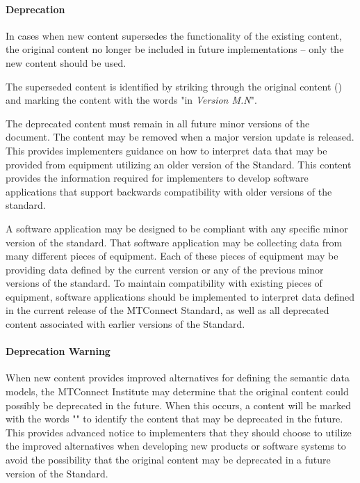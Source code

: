 \paragraph{Deprecation}\mbox{}

In cases when new content supersedes the functionality of the existing content, the original content \MUST no longer be included in future implementations -- only the new content should be used.

The superseded content is identified by striking through the original content () and marking the content with the words "\DEPRECATED in \textit{Version M.N}".

The deprecated content must remain in all future \gls{minor} versions of the document.  The content may be removed when a \gls{major} version update is released.  This provides implementers guidance on how to interpret data that may be provided from equipment utilizing an older version of the Standard.  This content provides the information required for implementers to develop software applications that support backwards compatibility with older versions of the standard.

A software application may be designed to be compliant with any specific \gls{minor} version of the standard.  That software application may be collecting data from many different pieces of equipment.  Each of these pieces of equipment may be providing data defined by the current version or any of the previous \gls{minor} versions of the standard.  To maintain compatibility with existing pieces of equipment, software applications should be implemented to interpret data defined in the current release of the MTConnect Standard, as well as all deprecated content associated with earlier versions of the Standard.

\paragraph{Deprecation Warning}\mbox{}

When new content provides improved alternatives for defining the \glspl{semantic data model}, the MTConnect Institute may determine that the original content could possibly be deprecated in the future.  When this occurs, a content will be marked with the words "\DEPRECATIONWARNING" to identify the content that may be deprecated in the future.  This provides advanced notice to implementers that they should choose to utilize the improved alternatives when developing new products or software systems to avoid the possibility that the original content may be deprecated in a future version of the Standard. 

